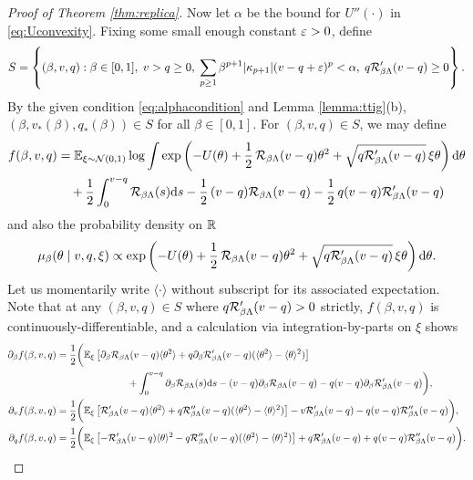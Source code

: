 \begin{proof}[Proof of Theorem \ref{thm:replica}]
Now let $\alpha$ be the bound for
$U''(\cdot)$ in \eqref{eq:Uconvexity}. Fixing some small enough constant
$\varepsilon>0$, define 
\[S=\left\{(\beta,v,q):\beta \in [0,1],\;
v>q \geq 0,\;
\sum_{p \geq 1} \beta^{p+1}|\kappa_{p+1}|(v-q+\varepsilon)^p<\alpha,\;
q\mathcal{R}_{\beta\Lambda}'(v-q) \geq 0\right\}.\]
By the given condition \eqref{eq:alphacondition} and Lemma \ref{lemma:ttig}(b),
$(\beta,v_*(\beta),q_*(\beta)) \in S$ for all $\beta \in [0,1]$.
For $(\beta,v,q) \in S$, we may define
\[\begin{aligned}
f(\beta,v,q)&=\mathbb{E}_{\xi \sim \mathcal{N}(0,1)} \log \int
\exp\left(-U(\theta)+\frac{1}{2}\,\mathcal{R}_{\beta\Lambda}(v-q)\theta^2
+\sqrt{q\mathcal{R}_{\beta\Lambda}'(v-q)}\,\xi\theta\right) \mathrm{d} \theta  \\
&\quad
+\frac{1}{2}\int_0^{v-q} \mathcal{R}_{\beta\Lambda}(s) \mathrm{d}  s
-\frac{1}{2}\,(v-q)\mathcal{R}_{\beta\Lambda}(v-q)
-\frac{1}{2}\,q(v-q)\mathcal{R}_{\beta\Lambda}'(v-q)
\end{aligned}\]
and also the probability density on $\mathbb{R}$
\[\mu_\beta(\theta \mid v,q,\xi)
\propto \exp\left(-U(\theta)+\frac{1}{2}\,\mathcal{R}_{\beta\Lambda}(v-q)\theta^2
+\sqrt{q\mathcal{R}_{\beta\Lambda}'(v-q)}\,\xi\theta\right) \mathrm{d} \theta.\]
Let us momentarily write $\langle \cdot \rangle$ without subscript
for its associated expectation.
Note that at any $(\beta,v,q) \in S$ where $q\mathcal{R}_{\beta\Lambda}'(v-q)>0$
strictly, $f(\beta,v,q)$ is continuously-differentiable,
and a calculation via integration-by-parts on $\xi$ shows 
\begin{align*}
\partial_\beta f(\beta,v,q)&=
\frac{1}{2}\bigg(\mathbb{E}_\xi\left[\partial_\beta \mathcal{R}_{\beta\Lambda}(v-q)\langle
\theta^2 \rangle+q\partial_\beta \mathcal{R}_{\beta\Lambda}'(v-q)
(\langle \theta^2 \rangle-\langle \theta \rangle^2)\right]\\
&\hspace{1in}
+\int_0^{v-q} \partial_\beta \mathcal{R}_{\beta \Lambda}(s)\mathrm{d} s
-(v-q)\partial_\beta \mathcal{R}_{\beta\Lambda}(v-q)
-q(v-q)\partial_\beta\mathcal{R}_{\beta\Lambda}'(v-q)\bigg),\\
\partial_v f(\beta,v,q)&=
\frac{1}{2}\bigg(\mathbb{E}_\xi\left[\mathcal{R}_{\beta\Lambda}'(v-q)\langle \theta^2 \rangle
+q\mathcal{R}_{\beta\Lambda}''(v-q)
(\langle \theta^2 \rangle-\langle \theta \rangle^2)\right]
-v\mathcal{R}_{\beta\Lambda}'(v-q)
-q(v-q)\mathcal{R}_{\beta\Lambda}''(v-q)\bigg),\\
\partial_q f(\beta,v,q)&=
\frac{1}{2}\bigg(\mathbb{E}_\xi\left[{-}\mathcal{R}_{\beta\Lambda}'(v-q)\langle \theta \rangle^2
-q\mathcal{R}_{\beta\Lambda}''(v-q)
(\langle \theta^2 \rangle-\langle \theta \rangle^2)\right]
+q\mathcal{R}_{\beta\Lambda}'(v-q)
+q(v-q)\mathcal{R}_{\beta\Lambda}''(v-q)\bigg).
\end{align*}

\end{proof}
